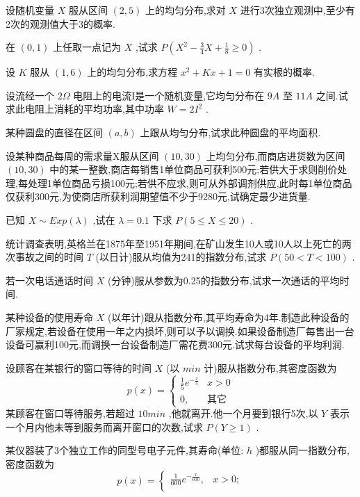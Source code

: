 \begin{xiti}
\item 设随机变量 $ X $ 服从区间 $ (2,5) $ 上的均匀分布,求对 $ X $ 进行3次独立观测中,至少有2次的观测值大于3的概率.
\item 在 $ (0,1) $ 上任取一点记为 $ X $ ,试求 $ P\left(X^{2}-\tfrac{3}{4} X+\tfrac{1}{8} \geqslant 0\right) $ .
\item 设 $ K $ 服从 $ (1,6) $ 上的均匀分布,求方程 $ x^{2}+K x+1=0 $ 有实根的概率.
\item 设流经一个 $ 2 \Omega $ 电阻上的电流I是一个随机变量,它均匀分布在 $ 9A $ 至 $ 11A $ 之间.试求此电阻上消耗的平均功率,其中功率 $ W=2 I^{2} $ .
\item 某种圆盘的直径在区间 $ (a,b) $ 上跟从均匀分布,试求此种圆盘的平均面积.
\item 设某种商品每周的需求量X服从区间 $ (10,30) $ 上均匀分布,而商店进货数为区间 $ (10,30) $ 中的某一整数,商店每销售1单位商品可获利500元;若供大于求则削价处理,每处理1单位商品亏损100元;若供不应求,则可从外部调剂供应,此时每1单位商品仅获利300元,为使商店所获利润期望值不少于9280元,试确定最少进货量.
\item 已知 $ X \sim E x p(\lambda) $ ,试在 $ \lambda=0.1 $ 下求 $ P(5 \leqslant X \leqslant 20) $ .
\item 统计调查表明,英格兰在1875年至1951年期间,在矿山发生10人或10人以上死亡的两次事故之间的时间 $ T $ (以日计)服从均值为241的指数分布,试求 $ P(50<T<100) $ .
\item 若一次电话通话时间 $ X $ (分钟)服从参数为0.25的指数分布,试求一次通话的平均时间.
\item 某种设备的使用寿命 $ X $ (以年计)跟从指数分布,其平均寿命为4年.制造此种设备的厂家规定,若设备在使用一年之内损坏,则可以予以调换.如果设备制造厂每售出一台设备可赢利100元,而调换一台设备制造厂需花费300元.试求每台设备的平均利润.
\item 设顾客在某银行的窗口等待的时间 $ X $ (以 $ min $ 计)服从指数分布,其密度函数为
\[
p(x)=\left\{
\begin{array}{ll}
{\frac{1}{5} e^{-\frac{x}{5}}} & {x>0} \\ 
{0,}  &  {\text{其它}}
\end{array}\right.
\]
某顾客在窗口等待服务,若超过 $ 10min $ ,他就离开.他一个月要到银行5次,以 $ Y $ 表示一个月内他未等到服务而离开窗口的次数,试求 $ P(Y \geqslant 1) $ .
\item 某仪器装了3个独立工作的同型号电子元件,其寿命(单位: $ h $ )都服从同一指数分布,密度函数为
\[
p(x)=\left\{\begin{array}{ll}
{\frac{1}{600} e^{-\frac{x}{600}},} & {x>0 ;} \\ 

\end{array}\]
\end{xiti}
